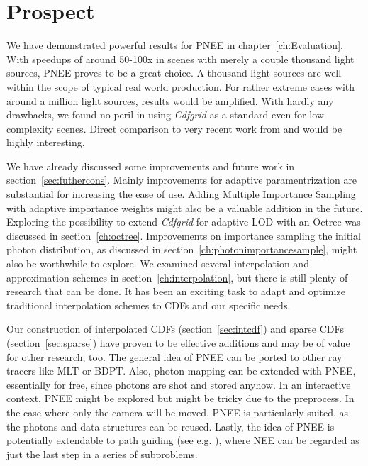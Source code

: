 \chapter{Prospect}
\label{ch:Prospect}

We have demonstrated powerful results for PNEE in chapter~\ref{ch:Evaluation}. With speedups of around 50-100x in scenes with merely a couple thousand light sources, PNEE proves to be a great choice. A thousand light sources are well within the scope of typical real world production. For rather extreme cases with around a million light sources, results would be amplified. With hardly any drawbacks, we found no peril in using \textit{Cdfgrid} as a standard even for low complexity scenes. Direct comparison to very recent work from \textcite{Vevoda:2018:BOR} and \textcite{Estevez} would be highly interesting.

 We have already discussed some improvements and future work in section~\ref{sec:futhercons}. Mainly improvements for adaptive paramentrization are substantial for increasing the ease of use. Adding Multiple Importance Sampling with adaptive importance weights might also be a valuable addition in the future. Exploring the possibility to extend \textit{Cdfgrid} for adaptive LOD with an Octree was discussed in section~\ref{ch:octree}. Improvements on importance sampling the initial photon distribution, as discussed in section~\ref{ch:photonimportancesample}, might also be worthwhile to explore. We examined several interpolation and approximation schemes in section~\ref{ch:interpolation}, but there is still plenty of research that can be done. It has been an exciting task  to adapt and optimize traditional interpolation schemes to CDFs and our specific needs. 

Our construction of interpolated CDFs (section~\ref{sec:intcdf}) and sparse CDFs (section~\ref{sec:sparse}) have proven to be effective additions and may be of value for other research, too. The general idea of PNEE can be ported to other ray tracers like MLT or BDPT. Also, photon mapping can be extended with PNEE, essentially for free, since photons are shot and stored anyhow. In an interactive context, PNEE might be explored but might be tricky due to the preprocess. In the case where only the camera will be moved, PNEE is particularly suited, as the photons and data structures can be reused. Lastly, the idea of PNEE is potentially extendable to path guiding (see e.g. \parencite{DBLP:journals/cgf/MullerGN17}), where NEE can be regarded as just the last step in a series of subproblems.

